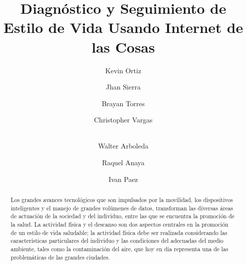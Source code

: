 \documentclass[runningheads,a4paper]{llncs}
\begin{document}
	
	\mainmatter  %
	
	\title{Diagnóstico y Seguimiento de	Estilo de Vida Usando Internet de las Cosas}
	
	\titlerunning{}
	
	\author{Kevin Ortiz
		\and Jhan Sierra \and Brayan Torres\and Christopher Vargas\and\\
		Walter Arboleda\and Raquel Anaya\and Ivan Paez}
	\authorrunning{}
	
	
	
	\maketitle
	
\begin{abstract}
Los grandes avances tecnológicos que son impulsados por la movilidad, los dispositivos inteligentes y el manejo de grandes volúmenes de datos, transforman las diversas áreas de actuación de la sociedad y del individuo, entre las que se encuentra la promoción de la salud. La actividad física y el descanso son dos aspectos centrales en la promoción de un estilo de vida saludable; la actividad física debe ser realizada considerando las características particulares del individuo y las condiciones del adecuadas del medio ambiente, tales como la contaminación del aire, que hoy en día representa una de las problemáticas de las grandes ciudades.
\end{abstract}
\end{document}
